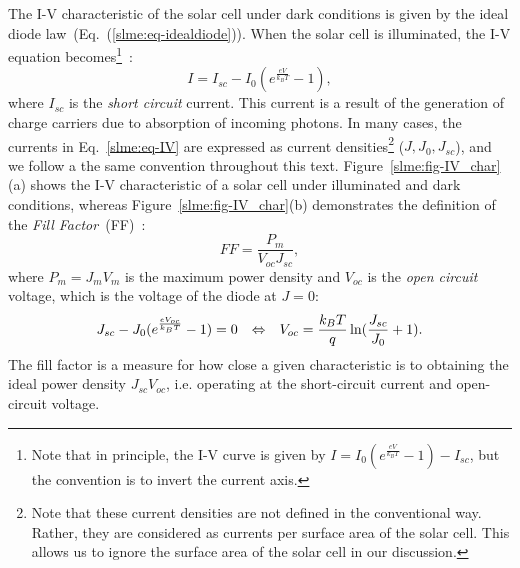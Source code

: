 \begin{refsection}
\pagebreak[4] 
 
The I-V characteristic of the solar cell under dark conditions is given by the 
ideal diode law~(Eq.~(\ref{slme:eq-idealdiode})). When the solar cell is 
illuminated, the I-V equation becomes\footnote{Note that in principle, the I-V 
curve is given by $I = I_0 (e^\frac{e V}{k_B T} - 1) - I_{sc}$, but the 
convention is to invert the current axis.}~\cite{Lindholm1979}: 
\begin{equation}\label{slme:eq-IV} 
I = I_{sc} - I_0 (e^\frac{e V}{k_B T} - 1), 
\end{equation} 
where $I_{sc}$ is the \textit{short circuit} current. This current is a result 
of the generation of charge carriers due to absorption of incoming photons. In 
many cases, the currents in Eq.~\ref{slme:eq-IV} are expressed as current 
densities\footnote{Note that these current densities are not defined in the 
conventional way. Rather, they are considered as currents per surface area of 
the solar cell. This allows us to ignore the surface area of the solar cell in 
our discussion.} ($J,J_0,J_{sc}$), and we follow a the same convention 
throughout this text. Figure~\ref{slme:fig-IV_char}(a) shows the I-V 
characteristic of a solar cell under illuminated and dark conditions, whereas 
Figure~\ref{slme:fig-IV_char}(b) demonstrates the definition of the 
\textit{Fill Factor}~(FF)~\cite{Fonash2010}: 
\begin{equation} 
FF = \frac{P_{m}}{V_{oc} J_{sc}}, 
\end{equation} 
where $P_m = J_m V_m$ is the maximum power density and $V_{oc}$ is the 
\textit{open circuit} voltage, which is the voltage of the diode at $J = 0$: 
\begin{equation} 
J_{sc} - J_0 (e^\frac{eV_{oc}}{k_B T}-1) = 0 \hspace{0.1in} \Leftrightarrow 
\hspace{0.1in} V_{oc} = \frac{k_B T}{q} \ln (\frac{J_{sc}}{J_0} + 1). 
\end{equation} 
The fill factor is a measure for how close a given characteristic is to 
obtaining the ideal power density $J_{sc}V_{oc}$, i.e. operating at the 
short-circuit current and open-circuit voltage. 
 

\end{refsection}
